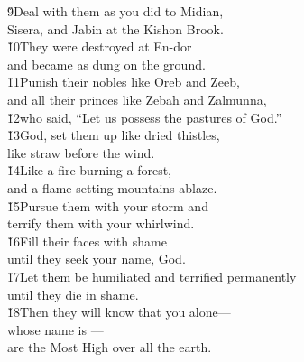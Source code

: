 \begin{poetry}
\poeml \v{9}Deal with them as you did to Midian, \\
\poemll    Sisera, and Jabin at the Kishon Brook. \\
\poeml \v{10}They were destroyed at En-dor \\
\poemll    and became as dung on the ground. \\
\poeml \v{11}Punish their nobles like Oreb and Zeeb, \\
\poemll    and all their princes like Zebah and Zalmunna, \\
\poeml \v{12}who said, ``Let us possess the pastures of God.'' \\
\poeml \v{13}God, set them up like dried thistles, \\
\poemll    like straw before the wind. \\
\poeml \v{14}Like a fire burning a forest, \\
\poemll    and a flame setting mountains ablaze. \\
\poeml \v{15}Pursue them with your storm and \\
\poemll    terrify them with your whirlwind. \\
\poeml \v{16}Fill their faces with shame \\
\poemll    until they seek your name, God. \\
\poeml \v{17}Let them be humiliated and terrified permanently \\
\poemll    until they die in shame. \\
\poeml \v{18}Then they will know that you alone--- \\
\poemll    whose name is --- \\
\poemlll       are the Most High over all the earth.
\end{poetry}

